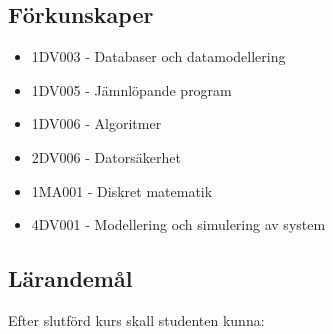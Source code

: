 \subsection*{Förkunskaper}

\begin{itemize}
\tightlist
\item
  1DV003 - Databaser och datamodellering
\item
  1DV005 - Jämnlöpande program
\item
  1DV006 - Algoritmer
\item
  2DV006 - Datorsäkerhet
\item
  1MA001 - Diskret matematik
\item
  4DV001 - Modellering och simulering av system
\end{itemize}

\subsection*{Lärandemål}

Efter slutförd kurs skall studenten kunna:

